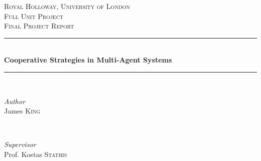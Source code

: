 \begin{titlepage} %
	\newcommand{\HRule}{\rule{\linewidth}{0.5mm}} %
	
	\center
	
	
	\textsc{\LARGE Royal Holloway, University of London}\\[1.5cm] %
	
	\textsc{\Large Full Unit Project}\\[0.5cm] %
	
	\textsc{\large Final Project Report}\\[0.5cm] %
	
	
	\HRule\\[0.4cm]
	
	{\huge\bfseries Cooperative Strategies in Multi-Agent Systems}\\[0.4cm] %
	
	\HRule\\[1.5cm]
	
	
	\begin{minipage}{0.4\textwidth}
		\begin{flushleft}
			\large
			\textit{Author}\\
			James \textsc{King} %
		\end{flushleft}
	\end{minipage}
	~
	\begin{minipage}{0.4\textwidth}
		\begin{flushright}
			\large
			\textit{Supervisor}\\
			Prof. Kostas \textsc{Stathis} %
		\end{flushright}
	\end{minipage}
	
	

\end{titlepage}
